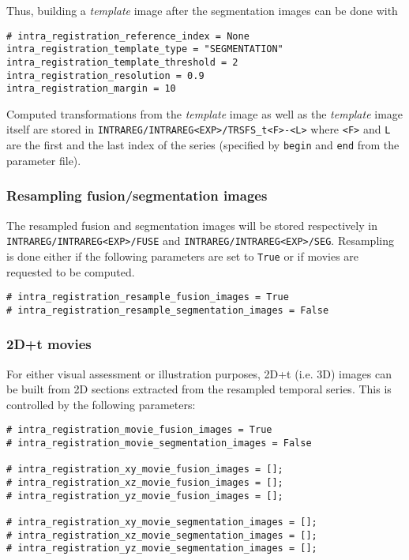Thus, building a \textit{template} image after the segmentation images can be done with
\begin{verbatim}
# intra_registration_reference_index = None
intra_registration_template_type = "SEGMENTATION"
intra_registration_template_threshold = 2
intra_registration_resolution = 0.9
intra_registration_margin = 10
\end{verbatim}

Computed transformations from the \textit{template} image as well as the \textit{template} image itself are stored in \verb|INTRAREG/INTRAREG<EXP>/TRSFS_t<F>-<L>| where \verb|<F>| and \verb|L| are the first and the last index of the series (specified by \verb|begin| and \verb|end| from the parameter file).

\subsubsection{Resampling fusion/segmentation images}

The resampled fusion and segmentation images will be stored respectively in \verb|INTRAREG/INTRAREG<EXP>/FUSE| and \verb|INTRAREG/INTRAREG<EXP>/SEG|. Resampling is done either if the following parameters are set to \verb|True| or if movies are requested to be computed.

\begin{verbatim}
# intra_registration_resample_fusion_images = True
# intra_registration_resample_segmentation_images = False
\end{verbatim}

\subsubsection{2D+t movies}

For either visual assessment or illustration purposes, 2D+t (i.e. 3D) images can be built from 2D sections extracted from the resampled temporal series. This is controlled by the following parameters:
\begin{verbatim}
# intra_registration_movie_fusion_images = True
# intra_registration_movie_segmentation_images = False

# intra_registration_xy_movie_fusion_images = [];
# intra_registration_xz_movie_fusion_images = [];
# intra_registration_yz_movie_fusion_images = [];

# intra_registration_xy_movie_segmentation_images = [];
# intra_registration_xz_movie_segmentation_images = [];
# intra_registration_yz_movie_segmentation_images = [];
\end{verbatim}

